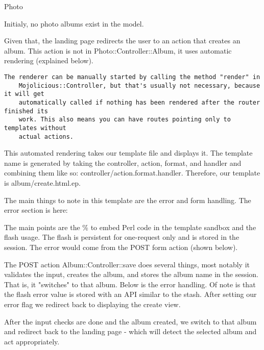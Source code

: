 \documentclass[14pt]{extreport}
\newcommand\Small{\fontsize{12}{13.0}\fontencoding{T1}\selectfont}
\newcommand*\LSTfont{\Small\ttfamily\SetTracking{encoding=*}{-60}\lsstyle}
\begin{document}
{\Large Photo}

Initialy, no photo albums exist in the model.

Given that, the landing page redirects the user to an action that creates an
album.  This action is not in Photo::Controller::Album, it uses automatic
rendering (explained below).

\begin{lstlisting}[style=BlockStyle]
    The renderer can be manually started by calling the method "render" in
    Mojolicious::Controller, but that's usually not necessary, because it will get
    automatically called if nothing has been rendered after the router finished its
    work. This also means you can have routes pointing only to templates without
    actual actions.
\end{lstlisting}

This automated rendering takes our template file and displays it.  The template
name is generated by taking the controller, action, format, and handler and
combining them like so: controller/action.format.handler.  Therefore, our
template is album/create.html.ep.

The main things to note in this template are the error and form handling.  The
error section is here:



The main points are the \% to embed Perl code in the template sandbox and the
flash usage.  The flash is persistent for one-request only and is stored in the
session.  The error would come from the POST form action (shown below).



The POST action Album::Controller::save does several things, most notably it
validates the input, creates the album, and stores the album name in the session. 
That is, it "switches" to that album. Below is the error handling.  Of note is that
the flash error value is stored with an API similar to the stash.  After setting our
error flag we redirect back to displaying the create view.



After the input checks are done and the album created, we switch to that album
and redirect back to the landing page - which will detect the selected album
and act appropriately.
\end{document}
